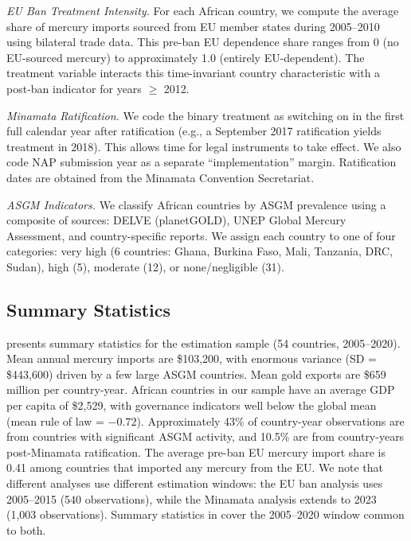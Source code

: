 \documentclass[12pt]{article}
\begin{document}
\textit{EU Ban Treatment Intensity.} For each African country, we compute the average share of mercury imports sourced from EU member states during 2005--2010 using bilateral trade data. This pre-ban EU dependence share ranges from 0 (no EU-sourced mercury) to approximately 1.0 (entirely EU-dependent). The treatment variable interacts this time-invariant country characteristic with a post-ban indicator for years $\geq$ 2012.

\textit{Minamata Ratification.} We code the binary treatment as switching on in the first full calendar year after ratification (e.g., a September 2017 ratification yields treatment in 2018). This allows time for legal instruments to take effect. We also code NAP submission year as a separate ``implementation'' margin. Ratification dates are obtained from the Minamata Convention Secretariat.

\textit{ASGM Indicators.} We classify African countries by ASGM prevalence using a composite of sources: DELVE (planetGOLD), UNEP Global Mercury Assessment, and country-specific reports. We assign each country to one of four categories: very high (6 countries: Ghana, Burkina Faso, Mali, Tanzania, DRC, Sudan), high (5), moderate (12), or none/negligible (31).

\subsection{Summary Statistics}

 presents summary statistics for the estimation sample (54 countries, 2005--2020). Mean annual mercury imports are \$103,200, with enormous variance (SD = \$443,600) driven by a few large ASGM countries. Mean gold exports are \$659 million per country-year. African countries in our sample have an average GDP per capita of \$2,529, with governance indicators well below the global mean (mean rule of law = $-0.72$). Approximately 43\% of country-year observations are from countries with significant ASGM activity, and 10.5\% are from country-years post-Minamata ratification. The average pre-ban EU mercury import share is 0.41 among countries that imported any mercury from the EU. We note that different analyses use different estimation windows: the EU ban analysis uses 2005--2015 (540 observations), while the Minamata analysis extends to 2023 (1,003 observations). Summary statistics in  cover the 2005--2020 window common to both.


\end{document}
